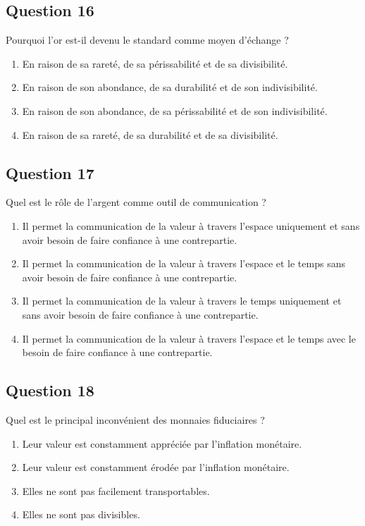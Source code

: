 \documentclass[12pt,a4paper]{article}
\begin{document}
\bigskip


\subsection*{Question 16}
Pourquoi l'or est-il devenu le standard comme moyen d'échange ?

\begin{enumerate}[label=\Alph*., leftmargin=*]
\item En raison de sa rareté, de sa périssabilité et de sa divisibilité.
\item En raison de son abondance, de sa durabilité et de son indivisibilité.
\item En raison de son abondance, de sa périssabilité et de son indivisibilité.
\item En raison de sa rareté, de sa durabilité et de sa divisibilité.
\end{enumerate}

\bigskip


\subsection*{Question 17}
Quel est le rôle de l'argent comme outil de communication ?

\begin{enumerate}[label=\Alph*., leftmargin=*]
\item Il permet la communication de la valeur à travers l'espace uniquement et sans avoir besoin de faire confiance à une contrepartie.
\item Il permet la communication de la valeur à travers l'espace et le temps sans avoir besoin de faire confiance à une contrepartie.
\item Il permet la communication de la valeur à travers le temps uniquement et sans avoir besoin de faire confiance à une contrepartie.
\item Il permet la communication de la valeur à travers l'espace et le temps avec le besoin de faire confiance à une contrepartie.
\end{enumerate}

\bigskip


\subsection*{Question 18}
Quel est le principal inconvénient des monnaies fiduciaires ?

\begin{enumerate}[label=\Alph*., leftmargin=*]
\item Leur valeur est constamment appréciée par l'inflation monétaire.
\item Leur valeur est constamment érodée par l'inflation monétaire.
\item Elles ne sont pas facilement transportables.
\item Elles ne sont pas divisibles.
\end{enumerate}
\end{document}
